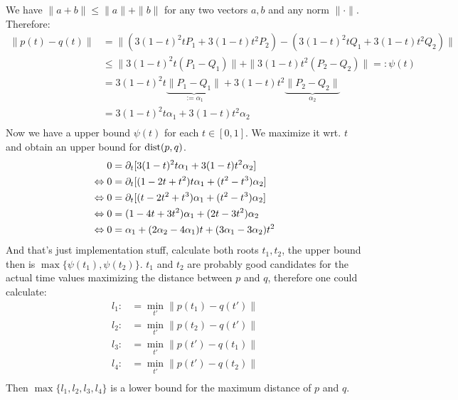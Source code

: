 We have $\|a+b\| \leq \|a\| + \|b\|$ for any two vectors $a,b$ and any norm $\|\cdot\|$.
Therefore:
%
\begin{align}
\|p(t)-q(t)\| &= \|(3(1-t)^2 t P_1 + 3 (1-t) t^2 P_2) - (3(1-t)^2 t Q_1 + 3(1-t) t^2 Q_2)\| \\
&\leq \|3(1-t)^2 t (P_1-Q_1)\| + \|3 (1-t) t^2 (P_2 - Q_2)\| =: \psi(t) \\
&= 3(1-t)^2 t \underbrace{\|P_1-Q_1\|}_{:=\alpha_1} + 3 (1-t) t^2 \underbrace{\|P_2 - Q_2\|}_{\alpha_2} \\
&= 3(1-t)^2 t \alpha_1 + 3 (1-t) t^2 \alpha_2 \\
\end{align}
%
Now we have a upper bound $\psi(t)$ for each $t \in [0,1]$.
We maximize it wrt. $t$ and obtain an upper bound for $\mathrm{dist}(p,q)$.
%
\begin{align}
0 &= \partial_t [3(1-t)^2 t \alpha_1 + 3 (1-t) t^2 \alpha_2] \\
\Leftrightarrow 0 &= \partial_t [(1-2t+t^2)t \alpha_1 + (t^2-t^3) \alpha_2] \\
\Leftrightarrow 0 &= \partial_t [(t-2t^2+t^3) \alpha_1 + (t^2-t^3) \alpha_2] \\
\Leftrightarrow 0 &= (1 - 4t+3t^2) \alpha_1 + (2t-3t^2) \alpha_2 \\
\Leftrightarrow 0 &= \alpha_1 + (2\alpha_2 - 4 \alpha_1)t + (3 \alpha_1 - 3 \alpha_2)t^2 \\
\end{align}
%
And that's just implementation stuff, calculate both roots $t_1, t_2$,
the upper bound then is $\max \{\psi(t_1), \psi(t_2)\}$.
$t_1$ and $t_2$ are probably good candidates for the actual time values
maximizing the distance between $p$ and $q$, therefore one could
calculate:
%
\begin{align}
l_1 :&= \min_{t'} \|p(t_1)-q(t')\| \\
l_2 :&= \min_{t'} \|p(t_2)-q(t')\| \\
l_3 :&= \min_{t'} \|p(t')-q(t_1)\| \\
l_4 :&= \min_{t'} \|p(t')-q(t_2)\| \\
\end{align}
%
Then $\max \{l_1, l_2, l_3, l_4\}$ is a lower bound for the maximum distance of $p$ and $q$.



